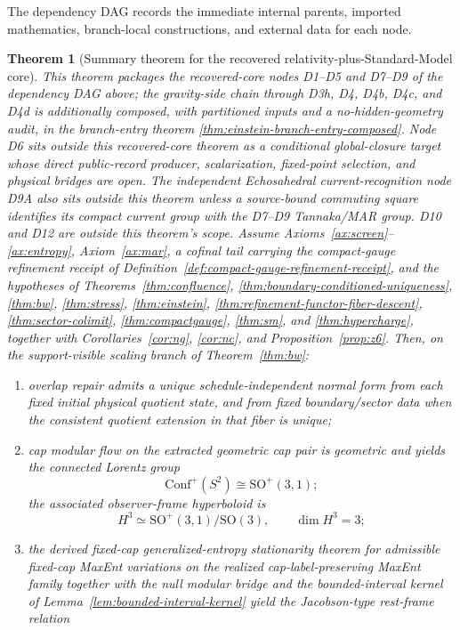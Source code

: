 \documentclass[11pt]{article}
\newtheorem{theorem}{Theorem}[section]
\newcommand{\Conf}{\mathrm{Conf}}
\begin{document}
The dependency DAG records the immediate internal parents, imported mathematics, branch-local constructions, and external data for each node.

\begin{theorem}[Summary theorem for the recovered relativity-plus-Standard-Model core]\label{thm:master}
This theorem packages the recovered-core nodes D1--D5 and D7--D9 of the dependency DAG above; the gravity-side chain through D3h, D4, D4b, D4c, and D4d is additionally composed, with partitioned inputs and a no-hidden-geometry audit, in the branch-entry theorem \ref{thm:einstein-branch-entry-composed}. Node D6 sits outside this recovered-core theorem as a conditional global-closure target whose direct public-record producer, scalarization, fixed-point selection, and physical bridges are open. The independent Echosahedral current-recognition node D9A also sits outside this theorem unless a source-bound commuting square identifies its compact current group with the D7--D9 Tannaka/MAR group. D10 and D12 are outside this theorem's scope. Assume Axioms~\ref{ax:screen}--\ref{ax:entropy}, Axiom~\ref{ax:mar}, a cofinal tail carrying the compact-gauge refinement receipt of Definition~\ref{def:compact-gauge-refinement-receipt}, and the hypotheses of Theorems~\ref{thm:confluence}, \ref{thm:boundary-conditioned-uniqueness}, \ref{thm:bw}, \ref{thm:stress}, \ref{thm:einstein}, \ref{thm:refinement-functor-fiber-descent}, \ref{thm:sector-colimit}, \ref{thm:compactgauge}, \ref{thm:sm}, and \ref{thm:hypercharge}, together with Corollaries~\ref{cor:ng}, \ref{cor:nc}, and Proposition~\ref{prop:z6}. Then, on the support-visible scaling branch of Theorem~\ref{thm:bw}:
\begin{enumerate}[label=(\roman*),leftmargin=2em]
\item overlap repair admits a unique schedule-independent normal form from each fixed initial
physical quotient state, and from fixed boundary/sector data when the consistent quotient
extension in that fiber is unique;
\item cap modular flow on the extracted geometric cap pair is geometric and yields the connected Lorentz group
\[
\Conf^+(S^2)\cong \mathrm{SO}^+(3,1);
\]
the associated observer-frame hyperboloid is
\[
H^3\simeq \mathrm{SO}^+(3,1)/\mathrm{SO}(3),
\qquad
\dim H^3=3;
\]
\item the derived fixed-cap generalized-entropy stationarity theorem for admissible fixed-cap MaxEnt variations on the realized cap-label-preserving MaxEnt family together with the null modular bridge and the bounded-interval kernel of Lemma~\ref{lem:bounded-interval-kernel} yield the Jacobson-type rest-frame relation

\end{enumerate}
\end{theorem}
\end{document}

